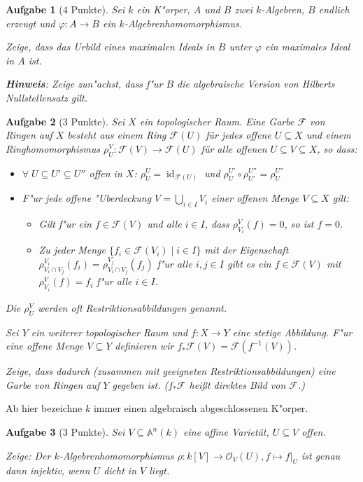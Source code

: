 \documentclass[a4paper, 12pt, numbers=noendperiod, chapterprefix=true, headsepline]{scrbook}
\theoremstyle{break}
\newtheorem{Aufg}{Aufgabe}
\theoremstyle{nonumberbreak}
\theoremstyle{nonumberplain}
\DeclareMathOperator{\id}{id}
\newcommand{\A}{\mathbb{A}}
\newcommand{\calF}{\mathcal{F}}
\newcommand{\calO}{\mathcal{O}}
\begin{document}
\begin{Aufg}[4 Punkte]
Sei $k$ ein K"orper, $A$ und $B$ zwei $k$-Algebren, $B$ endlich erzeugt und $\varphi \colon A \to B$ ein $k$-Algebrenhomomorphismus. 

Zeige, dass das Urbild eines maximalen Ideals in $B$ unter $\varphi$ ein maximales Ideal in $A$ ist.

\textbf{Hinweis}: Zeige zun"achst, dass f"ur $B$ die algebraische Version von Hilberts Nullstellensatz gilt.
\end{Aufg}

\begin{Aufg}[3 Punkte]
Sei $X$ ein topologischer Raum. Eine Garbe $\calF$ von Ringen auf $X$ besteht aus einem Ring $\calF(U)$ für jedes offene $U \subseteq X$ und einem Ringhomomorphismus $\rho^V_U\colon \calF(V) \to \calF(U)$ für alle offenen $U \subseteq V \subseteq X$, so dass:
\begin{itemize}
	\item $\forall \; U \subseteq U' \subseteq U''$ offen in $X$: $\rho^U_U = \id_{\calF(U)}$ und $\rho^{U'}_U \circ \rho^{U''}_{U'} = \rho^{U''}_{U}$
	\item F"ur jede offene "Uberdeckung $V = \bigcup_{i \in I} V_i$ einer offenen Menge $V \subseteq X$ gilt:
		\begin{itemize}
		\item Gilt f"ur ein $f \in \calF(V)$ und alle $i \in I$, dass $\rho^V_{V_i}(f) = 0$, so ist $f = 0$.
		\item Zu jeder Menge $\{f_i \in \calF(V_i) \mid i \in I\}$ mit der Eigenschaft $\rho^{V_i}_{V_i \cap V_j} (f_i) = \rho^{V_j}_{V_i \cap V_j} (f_j)$ f"ur alle $i, j \in I $ gibt es ein $f \in \calF(V)$ mit $\rho^V_{V_i}(f) = f_i$ f"ur alle $i \in I$.
	\end{itemize}
\end{itemize}
Die $\rho^V_U$ werden oft \textit{Restriktionsabbildungen} genannt.

Sei $Y$ ein weiterer topologischer Raum und $f \colon X \to Y$ eine stetige Abbildung.
F"ur eine offene Menge $V\subseteq Y$ definieren wir $f_*\calF(V) = \calF(f^{-1}(V))$. 

Zeige, dass dadurch (zusammen mit geeigneten Restriktionsabbildungen) eine Garbe von Ringen auf $Y$ gegeben ist. ($f_*\calF$ hei\ss t \textit{direktes Bild} von $\calF$.)
\end{Aufg}

Ab hier bezeichne $k$ immer einen algebraisch abgeschlossenen K"orper.

\begin{Aufg}[3 Punkte]
Sei $V \subseteq \A^n(k)$ eine affine Variet\"at, $U \subseteq V$ offen. 

Zeige: Der $k$-Algebrenhomomorphismus $\rho \colon k[V] \to \calO_V(U), f \mapsto f|_U$ ist genau dann injektiv, wenn $U$ dicht in $V$ liegt.
\end{Aufg}
\end{document}
